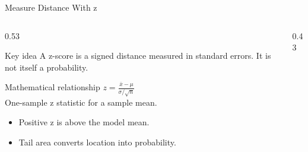 \documentclass[aspectratio=169]{beamer}
\begin{document}
\begin{frame}{Measure Distance With z}
\begin{columns}[T]
\begin{column}{0.53\textwidth}
\begin{alertblock}{Key idea}
\small A z-score is a signed distance measured in standard errors. It is not itself a probability.
\end{alertblock}

\begin{block}{Mathematical relationship}
\centering\Large $z=\frac{\bar{x}-\mu}{\sigma/\sqrt{n}}$\\[0.12cm]
\small One-sample z statistic for a sample mean.
\end{block}

\begin{itemize}
\small
\item Positive z is above the model mean.
\item Tail area converts location into probability.
\end{itemize}
\end{column}
\begin{column}{0.43\textwidth}
\begin{center}\end{center}
\end{column}
\end{columns}

\end{frame}
\end{document}
